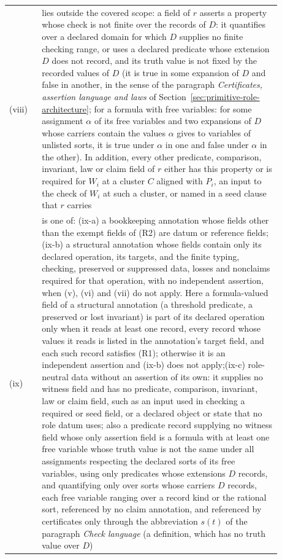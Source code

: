 \documentclass[11pt]{article}
\theoremstyle{definition}
\begin{document}
\begin{longtable}{@{}l>{\raggedright\arraybackslash}p{0.88\linewidth}@{}}
(viii) & lies outside the covered scope: a field of \(r\) asserts a property whose check is not finite over the records of \(D\): it quantifies over a declared domain for which \(D\) supplies no finite checking range, or uses a declared predicate whose extension \(D\) does not record, and its truth value is not fixed by the recorded values of \(D\) (it is true in some expansion of \(D\) and false in another, in the sense of the paragraph \emph{Certificates, assertion language and laws} of Section~\ref{sec:primitive-role-architecture}; for a formula with free variables: for some assignment \(\alpha\) of its free variables and two expansions of \(D\) whose carriers contain the values \(\alpha\) gives to variables of unlisted sorts, it is true under \(\alpha\) in one and false under \(\alpha\) in the other). In addition, every other predicate, comparison, invariant, law or claim field of \(r\) either has this property or is required for \(W_i\) at a cluster \(C\) aligned with \(P_i\), an input to the check of \(W_i\) at such a cluster, or named in a seed clause that \(r\) carries \\
(ix) & is one of: (ix-a) a bookkeeping annotation whose fields other than the exempt fields of (R2) are datum or reference fields;\newline (ix-b) a structural annotation whose fields contain only its declared operation, its targets, and the finite typing, checking, preserved or suppressed data, losses and nonclaims required for that operation, with no independent assertion, when (v), (vi) and (vii) do not apply. Here a formula-valued field of a structural annotation (a threshold predicate, a preserved or lost invariant) is part of its declared operation only when it reads at least one record, every record whose values it reads is listed in the annotation's target field, and each such record satisfies (R1); otherwise it is an independent assertion and (ix-b) does not apply;\newline (ix-c) role-neutral data without an assertion of its own: it supplies no witness field and has no predicate, comparison, invariant, law or claim field, such as an input used in checking a required or seed field, or a declared object or state that no role datum uses; also a predicate record supplying no witness field whose only assertion field is a formula with at least one free variable whose truth value is not the same under all assignments respecting the declared sorts of its free variables, using only predicates whose extensions \(D\) records, and quantifying only over sorts whose carriers \(D\) records, each free variable ranging over a record kind or the rational sort, referenced by no claim annotation, and referenced by certificates only through the abbreviation \(s(t)\) of the paragraph \emph{Check language} (a definition, which has no truth value over \(D\)) \\

\end{longtable}
\end{document}
